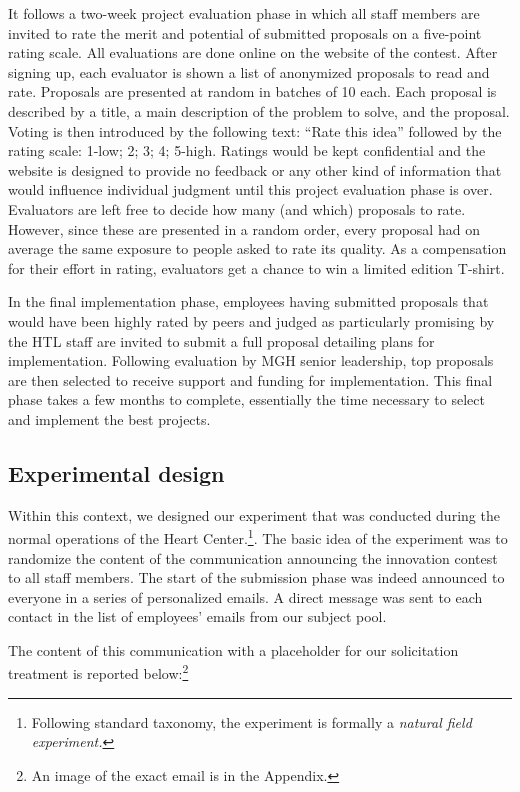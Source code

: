 \documentclass[11pt, titlepage]{article}
\begin{document}
It follows a two-week project evaluation phase in which all staff
members are invited to rate the merit and potential of submitted
proposals on a five-point rating scale. All evaluations are done online
on the website of the contest. After signing up, each evaluator is shown
a list of anonymized proposals to read and rate. Proposals are presented
at random in batches of 10 each. Each proposal is described by a title,
a main description of the problem to solve, and the proposal. Voting is
then introduced by the following text: ``Rate this idea'' followed by
the rating scale: 1-low; 2; 3; 4; 5-high. Ratings would be kept
confidential and the website is designed to provide no feedback or any
other kind of information that would influence individual judgment until
this project evaluation phase is over. Evaluators are left free to
decide how many (and which) proposals to rate. However, since these are
presented in a random order, every proposal had on average the same
exposure to people asked to rate its quality. As a compensation for
their effort in rating, evaluators get a chance to win a limited edition
T-shirt.

In the final implementation phase, employees having submitted proposals
that would have been highly rated by peers and judged as particularly
promising by the HTL staff are invited to submit a full proposal
detailing plans for implementation. Following evaluation by MGH senior
leadership, top proposals are then selected to receive support and
funding for implementation. This final phase takes a few months to
complete, essentially the time necessary to select and implement the
best projects.

\subsection{Experimental design}\label{experimental-design}

Within this context, we designed our experiment that was conducted
during the normal operations of the Heart Center.\footnote{Following
  standard taxonomy, the experiment is formally a \emph{natural field
  experiment.}}. The basic idea of the experiment was to randomize the
content of the communication announcing the innovation contest to all
staff members. The start of the submission phase was indeed announced to
everyone in a series of personalized emails. A direct message was sent
to each contact in the list of employees' emails from our subject pool.

The content of this communication with a placeholder for our
solicitation treatment is reported below:\footnote{An image of the exact
  email is in the Appendix.}
\end{document}
